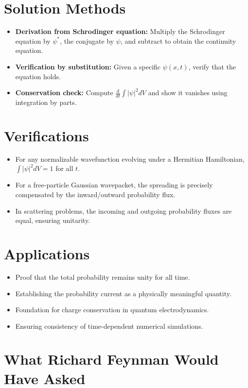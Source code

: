 \documentclass[11pt,openright]{book}
\begin{document}
\section*{Solution Methods}

\begin{itemize}
    \item \textbf{Derivation from Schrodinger equation:} Multiply the Schrodinger equation by $\psi^*$, the conjugate by $\psi$, and subtract to obtain the continuity equation.
    \item \textbf{Verification by substitution:} Given a specific $\psi(x,t)$, verify that the equation holds.
    \item \textbf{Conservation check:} Compute $\frac{d}{dt}\int|\psi|^2 dV$ and show it vanishes using integration by parts.
\end{itemize}
\section*{Verifications}

\begin{itemize}
    \item For any normalizable wavefunction evolving under a Hermitian Hamiltonian, $\int|\psi|^2 dV = 1$ for all $t$.
    \item For a free-particle Gaussian wavepacket, the spreading is precisely compensated by the inward/outward probability flux.
    \item In scattering problems, the incoming and outgoing probability fluxes are equal, ensuring unitarity.
\end{itemize}
\section*{Applications}

\begin{itemize}
    \item Proof that the total probability remains unity for all time.
    \item Establishing the probability current as a physically meaningful quantity.
    \item Foundation for charge conservation in quantum electrodynamics.
    \item Ensuring consistency of time-dependent numerical simulations.
\end{itemize}
\section*{What Richard Feynman Would Have Asked}
\end{document}
